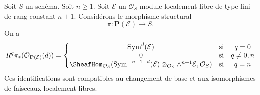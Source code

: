 \begin{lemma}
\label{lemma-cohomology-projective-bundle}
Soit $S$ un schéma. Soit $n \geq 1$.
Soit $\mathcal{E}$ un
$\mathcal{O}_S$-module localement libre de type fini de rang constant $n + 1$.
Considérons le morphisme structural
$$
\pi : \mathbf{P}(\mathcal{E}) \longrightarrow S.
$$
On a
$$
R^q\pi_*(\mathcal{O}_{\mathbf{P}(\mathcal{E})}(d)) =
\left\{
\begin{matrix}
\text{Sym}^d(\mathcal{E}) & \text{si} & q = 0 \\
0 & \text{si} & q \not = 0, n \\
\SheafHom_{\mathcal{O}_S}(
\text{Sym}^{- n - 1 - d}(\mathcal{E})
\otimes_{\mathcal{O}_S}
\wedge^{n + 1}\mathcal{E},
\mathcal{O}_S)
& \text{si} & q = n
\end{matrix}
\right.
$$
Ces identifications sont compatibles au changement de base et aux
isomorphismes de faisceaux localement libres.
\end{lemma}

